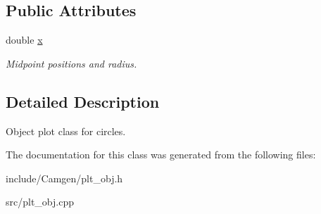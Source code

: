 \subsection*{Public Attributes}
\begin{DoxyCompactItemize}
\item 
\hypertarget{a00426_a5318995607103fd043f898989695804b}{}double \hyperlink{a00426_a5318995607103fd043f898989695804b}{x}\label{a00426_a5318995607103fd043f898989695804b}

\begin{DoxyCompactList}\small\item\em Midpoint positions and radius. \end{DoxyCompactList}\end{DoxyCompactItemize}


\subsection{Detailed Description}
Object plot class for circles. 

The documentation for this class was generated from the following files\+:\begin{DoxyCompactItemize}
\item 
include/\+Camgen/plt\+\_\+obj.\+h\item 
src/plt\+\_\+obj.\+cpp\end{DoxyCompactItemize}
